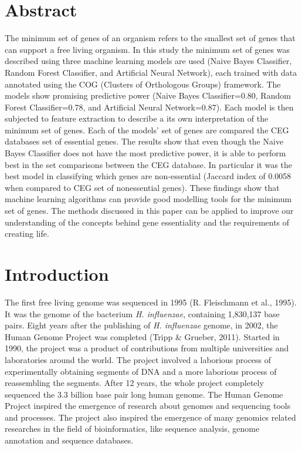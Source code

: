 \documentclass[]{report}
\date{}
\begin{document}
{
\hypersetup{linkcolor=black}
\setcounter{tocdepth}{2}
\tableofcontents
}

\chapter*{Abstract}\label{abstract}

The minimum set of genes of an organism refers to the smallest set of
genes that can support a free living organism. In this study the minimum
set of genes was described using three machine learning models are used
(Naive Bayes Classifier, Random Forest Classifier, and Artificial Neural
Network), each trained with data annotated using the COG (Clusters of
Orthologous Groups) framework. The models show promising predictive
power (Naive Bayes Classifier=0.80, Random Forest Classifier=0.78, and
Artificial Neural Network=0.87). Each model is then subjected to feature
extraction to describe a its own interpretation of the minimum set of
genes. Each of the models' set of genes are compared the CEG databases
set of essential genes. The results show that even though the Naive
Bayes Classifier does not have the most predictive power, it is able to
perform best in the set comparisons between the CEG database. In
particular it was the best model in classifying which genes are
non-essential (Jaccard index of 0.0058 when compared to CEG set of
nonessential genes). These findings show that machine learning
algorithms can provide good modelling tools for the minimum set of
genes. The methods discussed in this paper can be applied to improve our
understanding of the concepts behind gene essentiality and the
requirements of creating life.

\chapter{Introduction}\label{introduction}

The first free living genome was sequenced in 1995 (R. Fleischmann et
al., 1995). It was the genome of the bacterium \emph{H. influenzae},
containing 1,830,137 base pairs. Eight years after the publishing of
\emph{H. influenzae} genome, in 2002, the Human Genome Project was
completed (Tripp \& Grueber, 2011). Started in 1990, the project was a
product of contributions from multiple universities and laboratories
around the world. The project involved a laborious process of
experimentally obtaining segments of DNA and a more laborious process of
reassembling the segments. After 12 years, the whole project completely
sequenced the 3.3 billion base pair long human genome. The Human Genome
Project inspired the emergence of research about genomes and sequencing
tools and processes. The project also inspired the emergence of many
genomics related researches in the field of bioinformatics, like
sequence analysis, genome annotation and sequence databases.
\end{document}

